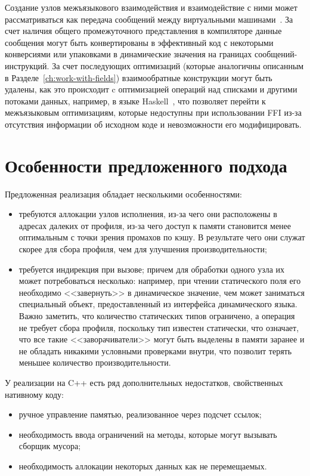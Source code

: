 \documentclass[times
]{itmo-student-thesis}
\begin{document}
Создание узлов межъязыкового взаимодействия и взаимодействие с ними может рассматриваться как передача сообщений между виртуальными машинами~\cite{graalvm-polyglot}. За счет наличия общего промежуточного представления в компиляторе данные сообщения могут быть конвертированы в эффективный код с некоторыми конверсиями или упаковками в динамические значения на границах сообщений-инструкций. За счет последующих оптимизаций (которые аналогичны описанным в Разделе~\ref{ch:work-with-fields}) взаимообратные конструкции могут быть удалены, как это происходит c оптимизацией операций над списками и другими потоками данных, например, в языке Haskell~\cite{streamfusion}, что позволяет перейти к межъязыковым оптимизациям, которые недоступны при использовании FFI из-за отсутствия информации об исходном коде и невозможности его модифицировать.

\section{Особенности предложенного подхода}\label{sec:peculiarities}
Предложенная реализация обладает несколькими особенностями:
\begin{itemize}
	\item требуются аллокации узлов исполнения, из-за чего они расположены в адресах далеких от профиля, из-за чего доступ к памяти становится менее оптимальным с точки зрения промахов по кэшу. В результате чего они служат скорее для сбора профиля, чем для улучшения производительности;
	\item требуется индирекция при вызове; причем для обработки одного узла их может потребоваться несколько: например, при чтении статического поля его необходимо <<завернуть>> в динамическое значение, чем может заниматься специальный объект, предоставленный из интерфейса динамического языка. Важно заметить, что количество статических типов ограничено, а операция не требует сбора профиля, поскольку тип известен статически, что означает, что все такие <<заворачиватели>> могут быть выделены в памяти заранее и не обладать никакими условными проверками внутри, что позволит терять меньшее количество производительности.
\end{itemize}

У реализации на C++ есть ряд дополнительных недостатков, свойственных нативному коду:
\begin{itemize}
	\item ручное управление памятью, реализованное через подсчет ссылок;
	\item необходимость ввода ограничений на методы, которые могут вызывать сборщик мусора;
	\item необходимость аллокации некоторых данных как не перемещаемых.
\end{itemize}
\end{document}
